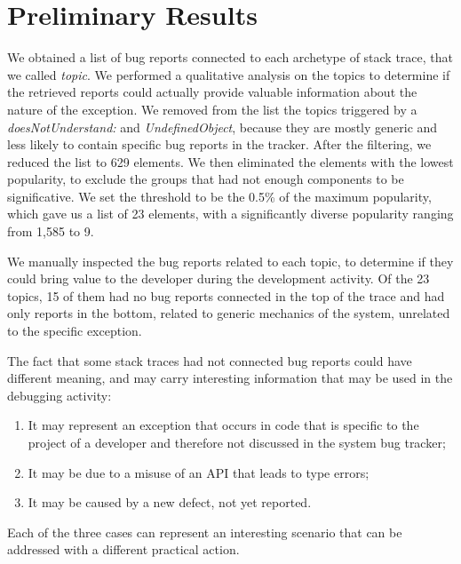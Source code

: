 \section{Preliminary Results}\label{sec:stacktraces-evaluation}

We obtained a list of bug reports connected to each archetype of stack trace, that we called \emph{topic}.
We performed a qualitative analysis on the topics to determine if the retrieved reports could actually provide valuable information about the nature of the exception.
We removed from the list the topics triggered by a \emph{doesNotUnderstand:} and \emph{UndefinedObject}, because they are mostly generic and less likely to contain specific bug reports in the tracker.
After the filtering, we reduced the list to 629 elements.
We then eliminated the elements with the lowest popularity, to exclude the groups that had not enough components to be significative.
We set the threshold to be the 0.5\% of the maximum popularity, which gave us a list of 23 elements, with a significantly diverse popularity ranging from 1,585 to 9.

We manually inspected the bug reports related to each topic, to determine if they could bring value to the developer during the development activity.
Of the 23 topics, 15 of them had no bug reports connected in the top of the trace and had only reports in the bottom, related to generic mechanics of the system, unrelated to the specific exception.

The fact that some stack traces had not connected bug reports could have different meaning, and may carry interesting information that may be used in the debugging activity:

\begin{enumerate}%

\item It may represent an exception that occurs in code that is specific to the project of a developer and therefore not discussed in the system bug tracker;

\item It may be due to a misuse of an API that leads to type errors;

\item It may be caused by a new defect, not yet reported.

\end{enumerate}

Each of the three cases can represent an interesting scenario that can be addressed with a different practical action.

